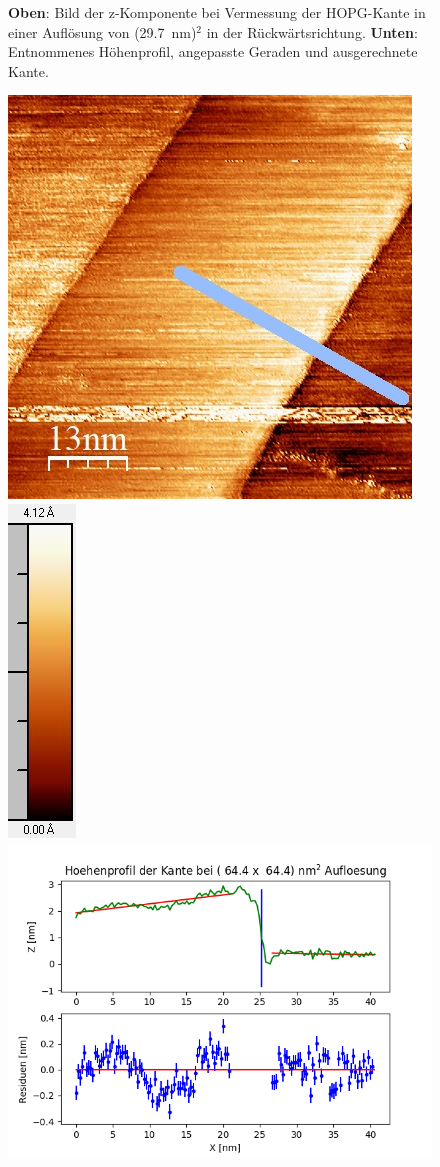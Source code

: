 \documentclass[12pt,a4paper]{article}
\begin{document}
\begin{figure}
\caption{\textbf{Oben}: Bild der z-Komponente bei Vermessung der HOPG-Kante in einer Auflösung von (\SI{29,7}{nm})$^2$ in der Rückwärtsrichtung. \textbf{Unten}: Entnommenes Höhenprofil, angepasste Geraden und ausgerechnete Kante.}
\end{figure}

\begin{figure}
\centering
\includegraphics[scale=0.6]{Bilder/Anhang/Kante/0644_Kante_vor.jpg}
\includegraphics[scale=0.6]{Bilder/Anhang/Kante/0644_Kante_vor_Skala.jpg}
\includegraphics[scale=0.6]{Bilder/Anhang/Kante/Profil_Kante_0644_vor.png}

\end{figure}
\end{document}

